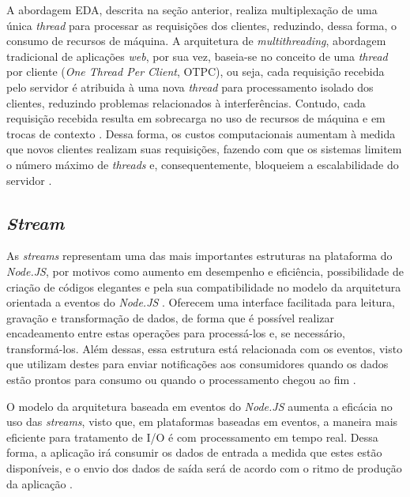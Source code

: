 \documentclass[12pt]{article}
\begin{document}
A abordagem EDA, descrita na seção anterior, realiza multiplexação de uma única \textit{thread} para processar 
as requisições dos clientes, reduzindo, dessa forma, o consumo de recursos de máquina. 
A arquitetura de \textit{multithreading}, abordagem tradicional de aplicações \textit{web}, por sua vez, baseia-se
no conceito de uma \textit{thread} por cliente (\textit{One Thread Per Client}, OTPC), ou seja, cada requisição
recebida pelo servidor é atribuida à uma nova \textit{thread} para processamento isolado dos clientes, reduzindo
problemas relacionados à interferências. Contudo, cada requisição recebida resulta em sobrecarga no uso de
recursos de máquina e em trocas de contexto \cite{JGD}. Dessa forma, os custos computacionais aumentam
à medida que novos clientes realizam suas requisições, fazendo com que os sistemas limitem o número máximo de
\textit{threads} e, consequentemente, bloqueiem a escalabilidade do servidor \cite{ZRHR}.


\subsection{\textit{Stream}}

As \textit{streams} representam uma das mais importantes estruturas na plataforma do \textit{Node.JS}, por motivos
como aumento em desempenho e eficiência, possibilidade de criação de códigos elegantes e pela sua compatibilidade
no modelo da arquitetura orientada a eventos do \textit{Node.JS} \cite[p. 119]{MARIO}. Oferecem uma interface facilitada 
para leitura, gravação e transformação de dados, de forma que é possível realizar encadeamento 
entre estas operações para processá-los e, se necessário, transformá-los. Além dessas, essa estrutura está 
relacionada com os eventos, visto que utilizam destes para enviar notificações aos consumidores 
quando os dados estão prontos para consumo ou quando o processamento chegou ao fim \cite[p. 28]{DIOGORESENDE}.

O modelo da arquitetura baseada em eventos do \textit{Node.JS} aumenta a eficácia no uso das \textit{streams}, visto que,
em plataformas baseadas em eventos, a maneira mais eficiente para tratamento de I/O é com processamento em tempo real.
Dessa forma, a aplicação irá consumir os dados de entrada a medida que estes estão disponíveis, e o envio dos dados
de saída será de acordo com o ritmo de produção da aplicação \cite[p. 119]{MARIO}.
\end{document}
